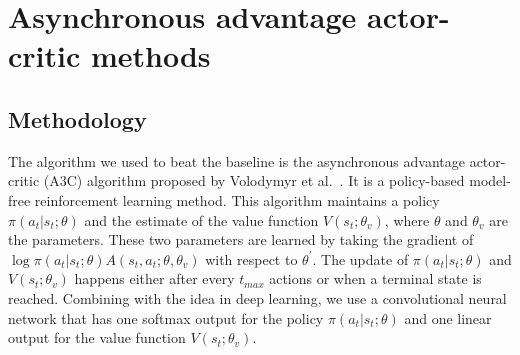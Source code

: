 
\section{Asynchronous advantage actor-critic methods}
\subsection{Methodology}
The algorithm we used to beat the baseline is the asynchronous advantage actor-critic (A3C) algorithm proposed by Volodymyr et al.~\cite{mnih2016asynchronous}. It is a policy-based model-free reinforcement learning method. This algorithm maintains a policy $\pi (a_{t}|s_{t};\theta)$ and the estimate of the value function $V(s_{t};\theta_{v})$, where $\theta$ and $\theta_{v}$ are the parameters. These two parameters are learned by taking the gradient of $\log \pi (a_{t}|s_{t};\theta) A(s_{t},a_{t};\theta,\theta_{v})$ with respect to $\theta^{\prime}$. The update of $\pi (a_{t}|s_{t};\theta)$ and $V(s_{t};\theta_{v})$ happens either after every $t_{max}$ actions or when a terminal state is reached. Combining with the idea in deep learning, we use a convolutional neural network that has one softmax output for the policy $\pi (a_{t}|s_{t};\theta)$ and one linear output for the value function $V(s_{t};\theta_{v})$.





